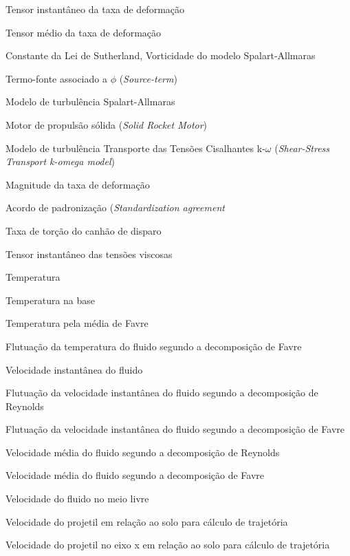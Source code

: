 \begin{siglas}
    \item[\(s_{ij}\)] Tensor instantâneo da taxa de deformação
    \item[\(S_{ij}\)] Tensor médio da taxa de deformação
    \item[\(S\)] Constante da Lei de Sutherland, Vorticidade do modelo Spalart-Allmaras
    \item[\(S_{\phi}\)] Termo-fonte associado a \(\phi\) (\textit{Source-term})
    \item[S-A] Modelo de turbulência Spalart-Allmaras
    \item[SRM] Motor de propulsão sólida (\textit{Solid Rocket Motor})
    \item[SST k-$\omega\)] Modelo de turbulência Transporte das Tensões Cisalhantes k-\(\omega\) (\textit{Shear-Stress Transport k-omega model})
    \item[\(S_t\)] Magnitude da taxa de deformação
    \item[STANAG] Acordo de padronização (\textit{Standardization agreement}
    \item[\(t_c\)] Taxa de torção do canhão de disparo
    \item[\(t_{ij}\)] Tensor instantâneo das tensões viscosas
    \item[\(T\)] Temperatura
    \item[\(T_{B}\)] Temperatura na base
    \item[\(\Tilde{T}\)] Temperatura pela média de Favre
    \item[\(T''\)] Flutuação da temperatura do fluido segundo a decomposição de Favre
    \item[\(u_i\)] Velocidade instantânea do fluido
    \item[\(u'_i\)] Flutuação da velocidade instantânea do fluido segundo a decomposição de Reynolds
    \item[\(u''_i\)] Flutuação da velocidade instantânea do fluido segundo a decomposição de Favre
    \item[\(U_i\)] Velocidade média do fluido segundo a decomposição de Reynolds
    \item[\(\Tilde{u}_i\)] Velocidade média do fluido segundo a decomposição de Favre
    \item[\(U_\infty\)] Velocidade do fluido no meio livre
    \item[\(U_{solo}\)] Velocidade do projetil em relação ao solo para cálculo de trajetória
    \item[\(U_{x_{solo}}\)] Velocidade do projetil no eixo x em relação ao solo para cálculo de trajetória

\end{siglas}
